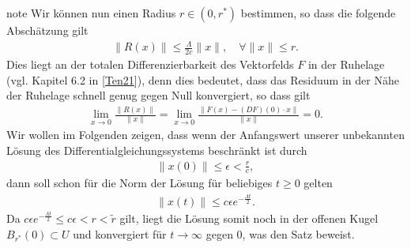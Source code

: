 \documentclass[letterpaper,10pt,english]{jupyterBook}
\begin{document}
\begin{sphinxadmonition}{note}
\sphinxAtStartPar
Wir können nun einen Radius \(r\in (0,{r^\ast})\) bestimmen, so dass die folgende Abschätzung gilt
\begin{equation}\label{equation:odestability/ruhelagen:eq:residuum}
\begin{split}\|R(x)\| \leq \frac{\Lambda}{2c} \|x\|, \quad \forall \|x\| \leq r.\end{split}
\end{equation}
\sphinxAtStartPar
Dies liegt an der totalen Differenzierbarkeit des Vektorfelds \(F\) in der Ruhelage (vgl. Kapitel 6.2 in {[}\hyperlink{cite.references:id12}{Ten21}{]}), denn dies bedeutet, dass das Residuum in der Nähe der Ruhelage schnell genug gegen Null konvergiert, so dass gilt
\begin{equation*}
\begin{split}\lim_{x\to 0} \frac{\|R(x)\|}{\|x\|} = \lim_{x\to 0}\frac{\|F(x)- (DF)(0)\cdot x\|}{\|x\|} = 0.\end{split}
\end{equation*}
\sphinxAtStartPar
Wir wollen im Folgenden zeigen, dass wenn der Anfangswert unserer unbekannten Lösung des Differentialgleichungssystems beschränkt ist durch
\begin{equation*}
\begin{split}\|x(0)\| \leq \epsilon <\frac{r}{c},\end{split}
\end{equation*}
\sphinxAtStartPar
dann soll schon für die Norm der Lösung für beliebiges \(t \geq 0\) gelten
\begin{equation*}
\begin{split}\|x(t)\| \leq c\epsilon e^{-\frac{\Lambda t}{2}}.\end{split}
\end{equation*}
\sphinxAtStartPar
Da \(c\epsilon e^{- \frac{\Lambda t}{2}} \leq c\epsilon < r <\tilde{r}\) gilt, liegt die Lösung somit noch in der offenen Kugel \(B_{{r^\ast}}(0) \subset U\) und konvergiert für \(t \rightarrow \infty\) gegen 0, was den Satz beweist.


\end{sphinxadmonition}
\end{document}
